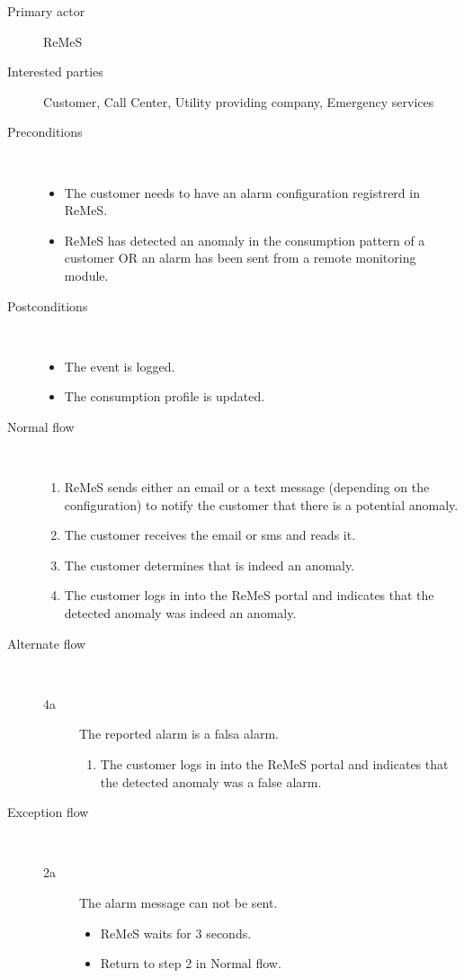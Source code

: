 \begin{description}
	\item[Primary actor] ReMeS
	\item[Interested parties] Customer, Call Center, Utility providing company,
	Emergency services
	\item[Preconditions] \ 
	\begin{itemize}
		\item The customer needs to have an alarm configuration registrerd in ReMeS.
		\item ReMeS has detected an anomaly in the consumption pattern of a
		customer OR an alarm has been sent from a remote monitoring module.
	\end{itemize}
	\item[Postconditions] \ 
	\begin{itemize}
		\item The event is logged.
		\item The consumption profile is updated.
	\end{itemize}
	\item[Normal flow] \ 
	\begin{enumerate}
	  	\item ReMeS sends either an email or a text message (depending on
	  	the configuration) to notify the customer that there is a potential anomaly.
	  	\item The customer receives the email or sms and reads it.
	  	\item The customer determines that is indeed an anomaly.
	  	\item The customer logs in into the ReMeS portal and indicates that the detected anomaly was indeed an anomaly.
	\end{enumerate}
	\item[Alternate flow] \ 
	\begin{description}
		\item[4a] The reported alarm is a falsa alarm.
		\begin{enumerate}
		  \item The customer logs in into the ReMeS portal and indicates that the detected anomaly was a false alarm.
		\end{enumerate}
	\end{description}
	\item[Exception flow] \ 
	\begin{description}
		\item[2a] The alarm message can not be sent.
		\begin{itemize}
			\item ReMeS waits for 3 seconds.
			\item Return to step 2 in Normal flow. 
		\end{itemize}
	\end{description}
\end{description}